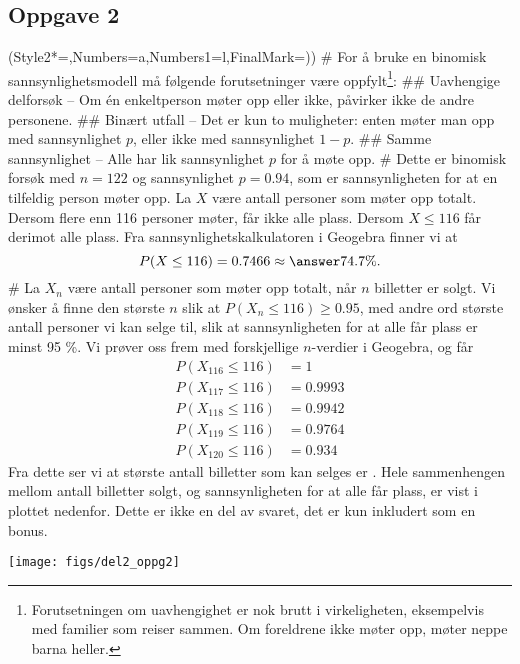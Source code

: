 \subsection*{Oppgave 2}
\begin{easylist}[enumerate]
	\ListProperties(Style2*=,Numbers=a,Numbers1=l,FinalMark={)})
	# For å bruke en binomisk sannsynlighetsmodell må følgende forutsetninger være oppfylt\footnote{Forutsetningen om uavhengighet er nok brutt i virkeligheten, eksempelvis med familier som reiser sammen. Om foreldrene ikke møter opp, møter neppe barna heller.}:
	## Uavhengige delforsøk -- Om én enkeltperson møter opp eller ikke, påvirker ikke de andre personene.
	## Binært utfall -- Det er kun to muligheter: enten møter man opp med sannsynlighet $p$, eller ikke med sannsynlighet $1 - p$.
	## Samme sannsynlighet -- Alle har lik sannsynlighet $p$ for å møte opp.
	# Dette er binomisk forsøk med $n = 122$ og sannsynlighet $p = 0.94$, som er sannsynligheten for at en tilfeldig person møter opp. La $X$ være antall personer som møter opp totalt. Dersom flere enn 116 personer møter, får ikke alle plass. Dersom $X \leq 116$ får derimot alle plass.
	Fra sannsynlighetskalkulatoren i Geogebra finner vi at
	\begin{equation*}
		P(X \leq 116) = 0.7466 \approx \answer{74.7 \%}.
	\end{equation*}
	# La $X_n$ være antall personer som møter opp totalt, når $n$ billetter er solgt. Vi ønsker å finne den største $n$ slik at $P(X_n \leq 116) \geq 0.95$, med andre ord største antall personer vi kan selge til, slik at sannsynligheten for at alle får plass er minst 95 \%.
	Vi prøver oss frem med forskjellige $n$-verdier i Geogebra, og får
	\begin{align*}
		P(X_{116} \leq 116) &= 1 \\
		P(X_{117} \leq 116) &= 0.9993 \\
		P(X_{118} \leq 116) &= 0.9942 \\
		P(X_{119} \leq 116) &= 0.9764 \\
		P(X_{120} \leq 116) &= 0.934 
	\end{align*}
	Fra dette ser vi at største antall billetter som kan selges er .
	Hele sammenhengen mellom antall billetter solgt, og sannsynligheten for at alle får plass, er vist i plottet nedenfor. Dette er ikke en del av svaret, det er kun inkludert som en bonus.
	\begin{center}
		\texttt{[image: figs/del2\_oppg2]}
	\end{center}
\end{easylist}


